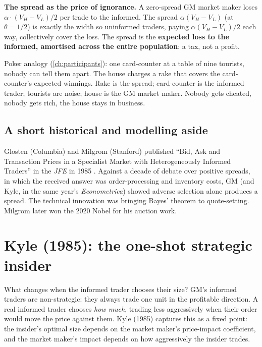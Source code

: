 \begin{intuitionbox}
\textbf{The spread as the price of ignorance.} A zero-spread GM
market maker loses $\alpha \cdot (V_H - V_L)/2$ per trade to the
informed. The spread $\alpha (V_H - V_L)$ (at $\theta = 1/2$) is
exactly the width so uninformed traders, paying $\alpha(V_H -
V_L)/2$ each way, collectively cover the loss. The spread is the
\textbf{expected loss to the informed, amortised across the entire
population}: a tax, not a profit.

Poker analogy (\cref{ch:participants}): one card-counter at a
table of nine tourists, nobody can tell them apart. The house
charges a rake that covers the card-counter's expected winnings.
Rake is the spread; card-counter is the informed trader; tourists
are noise; house is the GM market maker. Nobody gets cheated,
nobody gets rich, the house stays in business.
\end{intuitionbox}

\subsection{A short historical and modelling aside}
\label{subsec:gm_hist}

\begin{historybox}
Glosten (Columbia) and Milgrom (Stanford) published ``Bid, Ask and
Transaction Prices in a Specialist Market with Heterogeneously
Informed Traders'' in the \emph{JFE} in 1985 \citeGM{}. Against a
decade of debate over positive spreads, in which the received
answer was order-processing and inventory costs, GM (and Kyle, in
the same year's \emph{Econometrica}) showed adverse selection alone
produces a spread. The technical innovation was bringing Bayes' theorem to
quote-setting. Milgrom later won the 2020 Nobel for his auction
work.
\end{historybox}

\section{Kyle (1985): the one-shot strategic insider}
\label{sec:kyle}

What changes when the informed trader chooses their size? GM's
informed traders are non-strategic: they always trade one unit in
the profitable direction. A real informed trader chooses \emph{how
much}, trading less aggressively when their order would move the
price against them. Kyle (1985) captures this as a fixed point: the
insider's optimal size depends on the market maker's price-impact
coefficient, and the market maker's impact depends on how
aggressively the insider trades.

